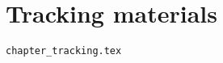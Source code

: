 \chapter{Tracking materials} %
\begin{flushright} {\tiny {\color{gray} \tt chapter\_tracking.tex}} \end{flushright}

 

\newpage 

